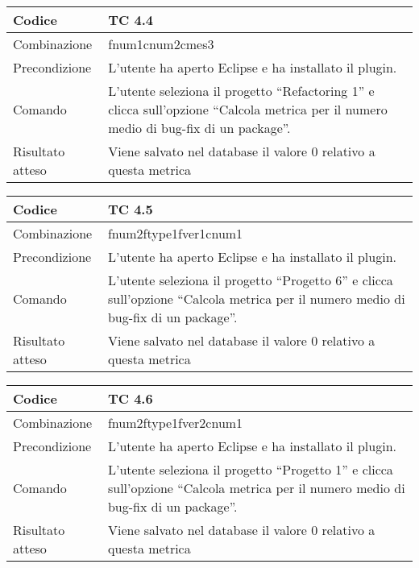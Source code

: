 \begin{table}[ht]
\begin{tabular}{|p{3cm}|p{9cm}|}
\hline
\cellcolor{lightgray}Codice				& TC 4.4								\\
\hline
\cellcolor{lightgray}Combinazione		& fnum1cnum2cmes3								\\
\hline
\cellcolor{lightgray}Precondizione		& L'utente ha aperto Eclipse e ha installato il plugin.			\\
\hline
\cellcolor{lightgray}Comando			& L'utente seleziona il progetto ``Refactoring 1''  e clicca sull'opzione ``Calcola metrica per il numero medio di bug-fix di un package''.	\\
\hline
\cellcolor{lightgray}Risultato atteso	& Viene salvato nel database il valore 0 relativo a questa metrica	\\
\hline
\end{tabular}
\end{table}

\begin{table}[ht]
\begin{tabular}{|p{3cm}|p{9cm}|}
\hline
\cellcolor{lightgray}Codice				& TC 4.5								\\
\hline
\cellcolor{lightgray}Combinazione		& fnum2ftype1fver1cnum1 									\\
\hline
\cellcolor{lightgray}Precondizione		& L'utente ha aperto Eclipse e ha installato il plugin.			\\
\hline
\cellcolor{lightgray}Comando			& L'utente seleziona il progetto ``Progetto 6''  e clicca sull'opzione ``Calcola metrica per il numero medio di bug-fix di un package''.	\\
\hline
\cellcolor{lightgray}Risultato atteso	& Viene salvato nel database il valore 0 relativo a questa metrica	\\
\hline
\end{tabular}
\end{table}

\begin{table}[ht]
\begin{tabular}{|p{3cm}|p{9cm}|}
\hline
\cellcolor{lightgray}Codice				& TC 4.6								\\
\hline
\cellcolor{lightgray}Combinazione		& fnum2ftype1fver2cnum1								\\
\hline
\cellcolor{lightgray}Precondizione		& L'utente ha aperto Eclipse e ha installato il plugin.				\\
\hline
\cellcolor{lightgray}Comando			& L'utente seleziona il progetto ``Progetto 1''  e clicca sull'opzione ``Calcola metrica per il numero medio di bug-fix di un package''.	\\
\hline
\cellcolor{lightgray}Risultato atteso	& Viene salvato nel database il valore 0 relativo a questa metrica	\\
\hline
\end{tabular}
\end{table}

